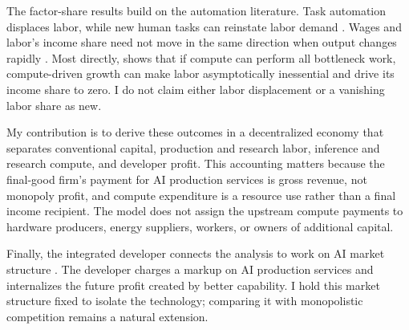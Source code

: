 The factor-share results build on the automation literature. Task automation
displaces labor, while new human tasks can reinstate labor demand
\citep{acemoglurestrepo2019}. Wages and labor's income share need not move in the
same direction when output changes rapidly
\citep{trammellkorinek2023,autorkausik2026}. Most directly,
\citet{restrepo2025agi} shows that if compute can perform all bottleneck work,
compute-driven growth can make labor asymptotically inessential and drive its
income share to zero. I do not claim either labor displacement or a vanishing
labor share as new.

My contribution is to derive these outcomes in a decentralized economy that
separates conventional capital, production and research labor, inference and
research compute, and developer profit. This accounting matters because the
final-good firm's payment for AI production services is gross revenue, not monopoly profit,
and compute expenditure is a resource use rather than a final income recipient.
The model does not assign the upstream compute payments to hardware producers,
energy suppliers, workers, or owners of additional capital.

Finally, the integrated developer connects the analysis to work on AI market
structure \citep{korinekvipra2025,gans2024,demireretal2025}. The developer
charges a markup on AI production services and internalizes the future profit
created by better capability. I hold this market structure fixed to isolate the
technology; comparing it with monopolistic competition remains a natural
extension.
